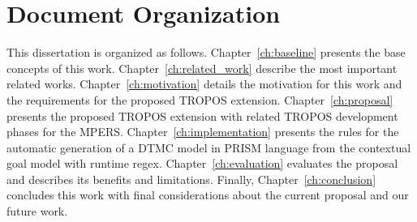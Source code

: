 \section{Document Organization}

This dissertation is organized as follows. Chapter~\ref{ch:baseline} presents the base concepts of this work. Chapter~\ref{ch:related_work} describe the most important related works. Chapter~\ref{ch:motivation} details the motivation for this work and the requirements for the proposed TROPOS extension. Chapter~\ref{ch:proposal} presents the proposed TROPOS extension with related TROPOS development phases for the MPERS. Chapter~\ref{ch:implementation} presents the rules for the automatic generation of a DTMC model in PRISM language from the contextual goal model with runtime regex. Chapter~\ref{ch:evaluation} evaluates the proposal and describes its benefits and limitations. Finally, Chapter~\ref{ch:conclusion} concludes this work with final considerations about the current proposal and our future work.